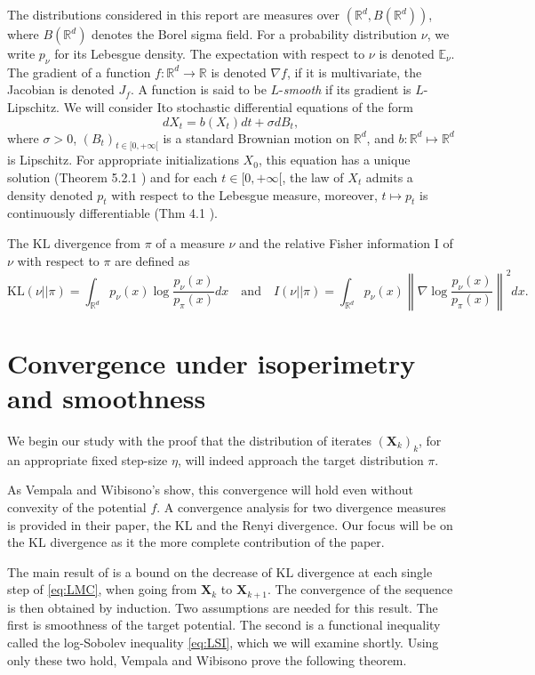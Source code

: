 \documentclass[11pt,twoside]{article}
\theoremstyle{definition}
\newcommand{\E}{\mathbb{E}}
\newcommand{\R}{\mathbb{R}}
\newcommand{\bX}{\mathbf{X}}
\newcommand{\KL}{\text{KL}}
\begin{document}
The distributions considered in this report are measures over $(\R^d, B(\R^d))$, where $B(\R^d)$ denotes the Borel sigma field. For a probability distribution $\nu$, we write $p_\nu$ for its Lebesgue density. The expectation with respect to $\nu$ is denoted $\E_\nu$. The gradient of a function $f: \R^d \rightarrow \R$ is denoted $\nabla f$, if it is multivariate, the Jacobian is denoted $J_f$. A function is said to be $L$-\textit{smooth} if its gradient is $L$-Lipschitz. We will consider Ito stochastic differential equations of the form 
\[
dX_t =  b(X_t)dt + \sigma dB_t,
\]
where $\sigma > 0$, $(B_t)_{t\in [0, +\infty[}$ is a standard Brownian motion on $\R^d$, and $b: \R^d \mapsto \R^d$ is Lipschitz. For appropriate initializations $X_0$, this equation has a unique solution (Theorem 5.2.1 \cite{oksendal_stochastic_2003}) and for each $t\in [0, +\infty[$, the law of $X_t$ admits a density denoted $p_t$ with respect to the Lebesgue measure, moreover, $t \mapsto p_t$ is continuously differentiable (Thm 4.1 \cite{pavliotis_fokkerplanck_2014}). 

The $\KL$ divergence from $\pi$ of a measure $\nu$ and the relative Fisher information I of $\nu$ with respect to $\pi$ are defined as
\[
\KL(\nu || \pi) = \int_{\R^d} p_\nu(x)\log\frac{p_\nu(x)}{p_\pi(x)}dx \quad \text{and} \quad I(\nu || \pi) = \int_{\R^d} p_\nu(x)\left\|\nabla \log\frac{p_\nu(x)}{p_\pi(x)}\right\|^2dx.
\]

\section{Convergence under isoperimetry and smoothness}

We begin our study with the proof that the distribution of iterates $(\bX_k)_k$, for an appropriate fixed step-size $\eta$, will indeed approach the target distribution $\pi$. 

As Vempala and Wibisono's show, this convergence will hold even without convexity of the potential $f$. A convergence analysis for two divergence measures is provided in their paper\cite{vempala_rapid_2019}, the $\KL$ and the Renyi divergence. Our focus will be on the $\KL$ divergence as it the more complete contribution of the paper.

The main result of \cite{vempala_rapid_2019} is a bound on the decrease of $\KL$ divergence at each single step of \eqref{eq:LMC}, when going from $\bX_k$ to $\bX_{k+1}$. The convergence of the sequence is then obtained by induction. Two assumptions are needed for this result. The first is smoothness of the target potential. The second is a functional inequality called the log-Sobolev inequality \eqref{eq:LSI}, which we will examine shortly. Using only these two hold, Vempala and Wibisono prove the following theorem. 
\end{document}
